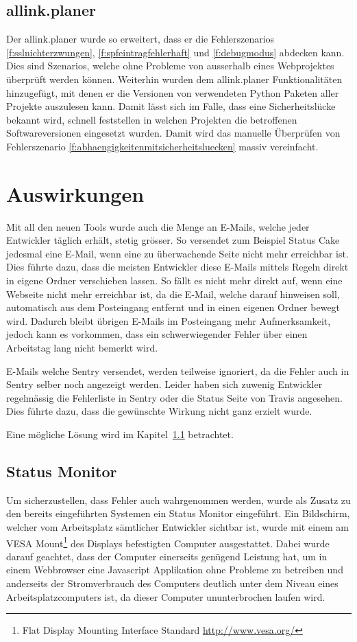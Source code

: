 \subsection{allink.planer}
\label{sub:proof_allink_planer}
Der allink.planer wurde so erweitert, dass er die Fehlerszenarios \ref{f:sslnichterzwungen}, \ref{f:spfeintragfehlerhaft} und \ref{f:debugmodus} abdecken kann. Dies sind Szenarios, welche ohne Probleme von ausserhalb eines Webprojektes überprüft werden können. Weiterhin wurden dem allink.planer Funktionalitäten hinzugefügt, mit denen er die Versionen von verwendeten Python Paketen aller Projekte auszulesen kann. Damit lässt sich im Falle, dass eine Sicherheitslücke bekannt wird, schnell feststellen in welchen Projekten die betroffenen Softwareversionen eingesetzt wurden. Damit wird das manuelle Überprüfen von Fehlerszenario \ref{f:abhaengigkeitenmitsicherheitsluecken} massiv vereinfacht.

\section{Auswirkungen}
\label{sec:auswirkungen}
Mit all den neuen Tools wurde auch die Menge an E-Mails, welche jeder Entwickler täglich erhält, stetig grösser. So versendet zum Beispiel Status Cake jedesmal eine E-Mail, wenn eine zu überwachende Seite nicht mehr erreichbar ist. Dies führte dazu, dass die meisten Entwickler diese E-Mails mittels Regeln direkt in eigene Ordner verschieben lassen. So fällt es nicht mehr direkt auf, wenn eine Webseite nicht mehr erreichbar ist, da die E-Mail, welche darauf hinweisen soll, automatisch aus dem Posteingang entfernt und in einen eigenen Ordner bewegt wird. Dadurch bleibt übrigen E-Mails im Posteingang mehr Aufmerksamkeit, jedoch kann es vorkommen, dass ein schwerwiegender Fehler über einen Arbeitstag lang nicht bemerkt wird.

E-Mails welche Sentry versendet, werden teilweise ignoriert, da die Fehler auch in Sentry selber noch angezeigt werden. Leider haben sich zuwenig Entwickler regelmässig die Fehlerliste in Sentry oder die Status Seite von Travis angesehen. Dies führte dazu, dass die gewünschte Wirkung nicht ganz erzielt wurde.

Eine mögliche Lösung wird im Kapitel~\ref{sub:status_monitor} betrachtet.

\subsection{Status Monitor}
\label{sub:status_monitor}
Um sicherzustellen, dass Fehler auch wahrgenommen werden, wurde als Zusatz zu den bereits eingeführten Systemen ein Status Monitor eingeführt. Ein Bildschirm, welcher vom Arbeitsplatz sämtlicher Entwickler sichtbar ist, wurde mit einem am VESA Mount\footnote{Flat Display Mounting Interface Standard \url{http://www.vesa.org/}} des Displays befestigten Computer ausgestattet. Dabei wurde darauf geachtet, dass der Computer einerseits genügend Leistung hat, um in einem Webbrowser eine Javascript Applikation ohne Probleme zu betreiben und anderseits der Stromverbrauch des Computers deutlich unter dem Niveau eines Arbeitsplatzcomputers ist, da dieser Computer ununterbrochen laufen wird.

